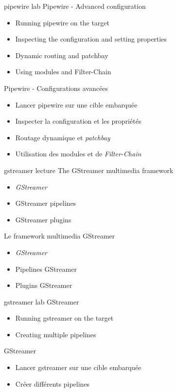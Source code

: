 {pipewire}
{lab}
{Pipewire - Advanced configuration}
{
  \begin{itemize}
  \item Running pipewire on the target
  \item Inspecting the configuration and setting properties
  \item Dynamic routing and patchbay
  \item Using modules and Filter-Chain
  \end{itemize}
  \vspace{0.5em}
}
{Pipewire - Configurations avancées}
{
  \begin{itemize}
  \item Lancer pipewire sur une cible embarquée
  \item Inspecter la configuration et les propriétés
  \item Routage dynamique et {\em patchbay}
  \item Utilisation des modules et de {\em Filter-Chain}
  \end{itemize}
  \vspace{0.5em}
}
{gstreamer}
{lecture}
{The GStreamer multimedia framework}
{
  \begin{itemize}
  \item {\em GStreamer}
  \item GStreamer pipelines
  \item GStreamer plugins
  \end{itemize}
  \vspace{0.5em}
}
{Le framework multimedia GStreamer}
{
  \begin{itemize}
  \item {\em GStreamer}
  \item Pipelines GStreamer
  \item Plugins GStreamer
  \end{itemize}
  \vspace{0.5em}
}
{gstreamer}
{lab}
{GStreamer}
{
  \begin{itemize}
  \item Running gstreamer on the target
  \item Creating multiple pipelines
  \end{itemize}
  \vspace{0.5em}
}
{GStreamer}
{
  \begin{itemize}
  \item Lancer gstreamer sur une cible embarquée
  \item Créer différents pipelines
  \end{itemize}
  \vspace{0.5em}
}

